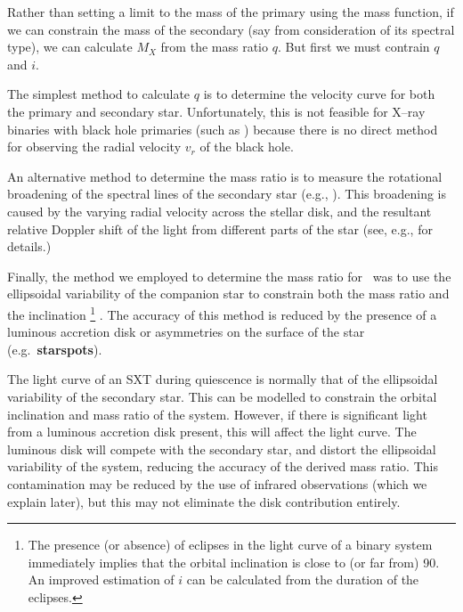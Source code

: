 Rather than setting a limit to the mass of the primary using the mass
function, if we can constrain the mass of the secondary (say from
consideration of its spectral type), we can calculate $M_{X}$ from the
mass ratio $q$. But first we must contrain $q$ and $i$. %

\vspace{\myparskip}

The simplest method to calculate $q$ is to determine the velocity
curve for both the primary and secondary star. Unfortunately, this is
not feasible for X--ray binaries with black hole primaries (such as \groj) because there is no direct method for observing the radial velocity $v_r$ of the black hole. %

\vspace{\myparskip}

An alternative method to determine the mass ratio is to measure the rotational broadening of the spectral lines of the secondary star (e.g., %
%
). This broadening is caused by the varying radial velocity across the
stellar disk, and the resultant relative Doppler shift of the light
from different parts of the star (see, e.g., %
for details.) %

\vspace{\myparskip}

Finally, the method we employed to determine the mass ratio for \groj\ was to use the ellipsoidal variability of the companion star to constrain
both the mass ratio and the inclination%
\footnote{
\label{cha:Introduction:sec:X--rayBinaries:subsec:DeterminingTheMassOfThePrimary:foot:inc}
The presence (or absence) of eclipses in the light curve of a binary system
immediately implies that the orbital inclination is close to (or far from) 90\degr. An improved estimation of $i$ can be calculated from the
duration of the eclipses. %
}%
. The accuracy of this method is
reduced by the presence of a luminous accretion disk or asymmetries on the surface of the star
(e.g.\ \textbf{starspots}). %

\vspace{\myparskip}

The light curve of an SXT during quiescence is normally that of the ellipsoidal variability of the secondary star. This can be modelled to constrain the orbital inclination and mass ratio of the system. However, if there is significant light from a luminous accretion disk
present, this will affect the light curve. The luminous disk will compete with the secondary star, and distort the ellipsoidal variability of the system, reducing the accuracy of the derived mass ratio. This contamination may be reduced by the use of infrared observations (which we explain later), but this may not eliminate the disk contribution entirely. 

